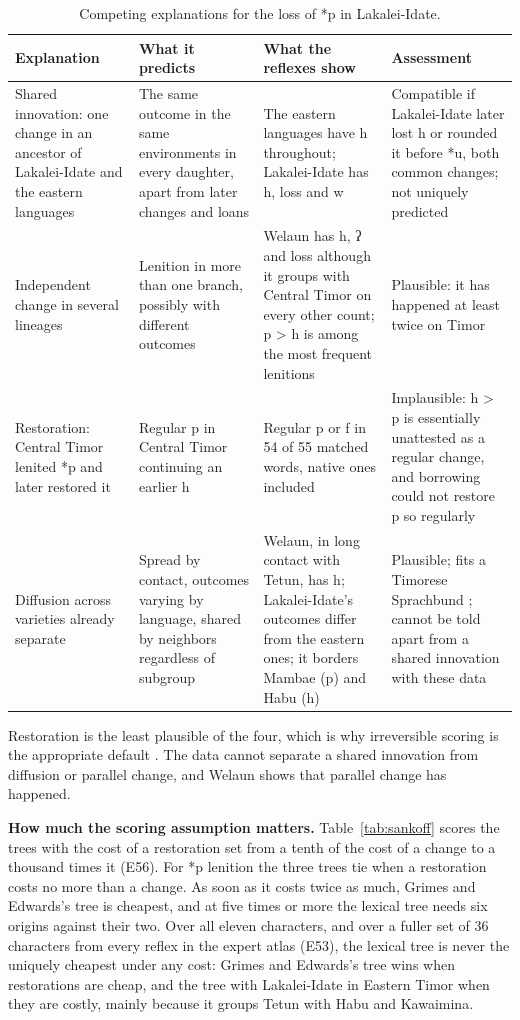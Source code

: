 \documentclass[11pt]{article}
\newcommand{\hd}[1]{\begin{minipage}[b]{\linewidth}\raggedright #1\end{minipage}}
\begin{document}
\begin{table}[tbp]
\caption{Competing explanations for the loss of *p in
Lakalei-Idate.}
\label{tab:explanations}
\begin{tabularx}{\linewidth}{@{}L{0.8}L{1}L{1.12}L{1.08}@{}}
\toprule
\hd{Explanation} & \hd{What it predicts} & \hd{What the reflexes show} & \hd{Assessment} \\
\midrule
Shared innovation: one change in an ancestor of Lakalei-Idate and the eastern languages & The same outcome in the same environments in every daughter, apart from later changes and loans & The eastern languages have h throughout; Lakalei-Idate has h, loss and w & Compatible if Lakalei-Idate later lost h or rounded it before *u, both common changes; not uniquely predicted \\
Independent change in several lineages & Lenition in more than one branch, possibly with different outcomes & Welaun has h, ʔ and loss although it groups with Central Timor on every other count; p \textgreater{} h is among the most frequent lenitions \citep{kummel2007} & Plausible: it has happened at least twice on Timor \\
Restoration: Central Timor lenited *p and later restored it & Regular p in Central Timor continuing an earlier h & Regular p or f in 54 of 55 matched words, native ones included & Implausible: h \textgreater{} p is essentially unattested as a regular change, and borrowing could not restore p so regularly \\
Diffusion across varieties already separate & Spread by contact, outcomes varying by language, shared by neighbors regardless of subgroup & Welaun, in long contact with Tetun, has h; Lakalei-Idate's outcomes differ from the eastern ones; it borders Mambae (p) and Habu (h) & Plausible; fits a Timorese Sprachbund \citep{hull2001b,schapper2020}; cannot be told apart from a shared innovation with these data \\
\bottomrule
\end{tabularx}
\end{table}

Restoration is the least plausible of the four, which is why irreversible scoring is the appropriate default \citep{campbell2013}. The data cannot separate a shared innovation from diffusion or parallel change, and Welaun shows that parallel change has happened.

\textbf{How much the scoring assumption matters.} Table~\ref{tab:sankoff} scores the trees with the cost of a restoration set from a tenth of the cost of a change to a thousand times it (E56). For *p lenition the three trees tie when a restoration costs no more than a change. As soon as it costs twice as much, Grimes and Edwards's tree is cheapest, and at five times or more the lexical tree needs six origins against their two. Over all eleven characters, and over a fuller set of 36 characters from every reflex in the expert atlas (E53), the lexical tree is never the uniquely cheapest under any cost: Grimes and Edwards's tree wins when restorations are cheap, and the tree with Lakalei-Idate in Eastern Timor when they are costly, mainly because it groups Tetun with Habu and Kawaimina.
\end{document}
